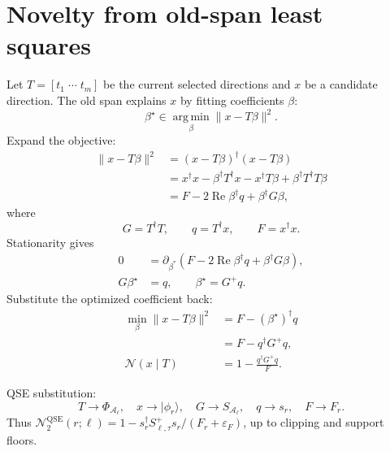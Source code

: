 \documentclass[10pt,twocolumn]{article}
\newcommand{\Acal}{\mathcal A}
\newcommand{\qse}{\mathrm{QSE}}
\newcommand{\eps}{\varepsilon}
\newcommand{\argminp}{\operatorname*{arg\,min}}
\newcommand{\ket}[1]{\lvert #1\rangle}
\begin{document}
\section{Novelty from old-span least squares}

Let \(T=[t_1\;\cdots\;t_m]\) be the current selected directions and \(x\) be a candidate direction. The old span explains \(x\) by fitting coefficients \(\beta\):
\begin{equation}
\beta^\star\in\argminp_\beta\|x-T\beta\|^2.
\label{eq:ls_problem}
\end{equation}
Expand the objective:
\begin{equation}
\begin{aligned}
\|x-T\beta\|^2
&=(x-T\beta)^\dagger(x-T\beta)\\
&=x^\dagger x-\beta^\dagger T^\dagger x-x^\dagger T\beta+\beta^\dagger T^\dagger T\beta\\
&=F-2\operatorname{Re}\beta^\dagger q+\beta^\dagger G\beta,
\end{aligned}
\label{eq:ls_expand}
\end{equation}
where
\begin{equation}
G=T^\dagger T,
\qquad
q=T^\dagger x,
\qquad
F=x^\dagger x.
\label{eq:GqF}
\end{equation}
Stationarity gives
\begin{equation}
\begin{aligned}
0&=\partial_{\beta^*}(F-2\operatorname{Re}\beta^\dagger q+\beta^\dagger G\beta),\\
G\beta^\star&=q,
\qquad
\beta^\star=G^+q.
\end{aligned}
\label{eq:normal_eq}
\end{equation}
Substitute the optimized coefficient back:
\begin{equation}
\begin{aligned}
\min_\beta\|x-T\beta\|^2
&=F-(\beta^\star)^\dagger q\\
&=F-q^\dagger G^+q,\\
\mathcal N(x\mid T)
&=1-\frac{q^\dagger G^+q}{F}.
\end{aligned}
\label{eq:novelty}
\end{equation}

\begin{paperbox}
QSE substitution:
\[
T\to\Phi_{\Acal_\ell},
\quad
x\to\ket{\phi_r},
\quad
G\to S_{\Acal_\ell},
\quad
q\to s_r,
\quad
F\to F_r.
\]
Thus \(\mathcal N_2^{\qse}(r;\ell)=1-s_r^\dagger S_{\ell,\tau}^+s_r/(F_r+\eps_F)\), up to clipping and support floors.
\end{paperbox}
\end{document}
